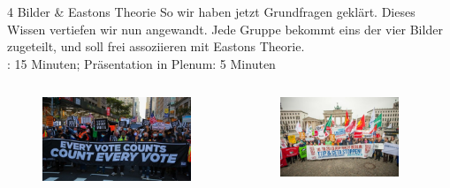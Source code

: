 \documentclass[11pt]{beamer}
\begin{document}
\begin{frame}[t]{4 Bilder \& Eastons Theorie}
So wir haben jetzt Grundfragen geklärt. Dieses Wissen vertiefen wir nun angewandt. Jede Gruppe bekommt eins der vier Bilder zugeteilt, und soll frei assoziieren mit Eastons Theorie. \\
: 15 Minuten; Präsentation in Plenum: 5 Minuten
	\begin{columns}
		\begin{column}{0.25\textwidth}
			\begin{figure}[ht]
				\includegraphics[width=\textwidth]{pics/s2-1.jpg}
			\end{figure}
		\end{column}
		\begin{column}{0.25\textwidth}
			\begin{figure}[ht]
				\includegraphics[width=\textwidth]{pics/s2-2.jpg}
			\end{figure}
		\end{column}
		\begin{column}{0.25\textwidth}

\end{column}
\end{columns}
\end{frame}
\end{document}

